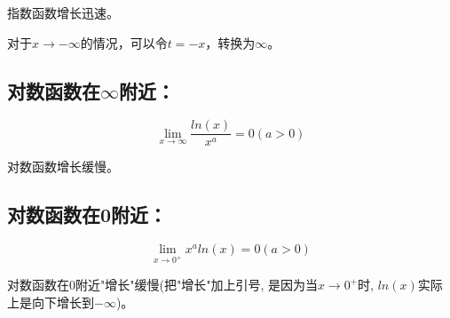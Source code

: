 \documentclass[11pt, b5paper, oneside]{book}
\begin{document}
指数函数增长迅速。

对于$x\to -\infty$的情况，可以令$t=-x$，转换为$\infty$。

\subsection{对数函数在$\infty$附近：}

\begin{equation}
    \lim\limits_{x\to \infty}\frac{ln(x)}{x^a} = 0 (a>0)
\end{equation}

对数函数增长缓慢。

\subsection{对数函数在0附近：}

\begin{equation}
    \lim\limits_{x\to 0^+}x^aln(x) = 0 (a>0)
\end{equation}

对数函数在0附近"增长"缓慢(把"增长"加上引号, 是因为当$x\to 0^+$时, $ln(x)$实际上是向下增长到$-\infty$)。
\end{document}
